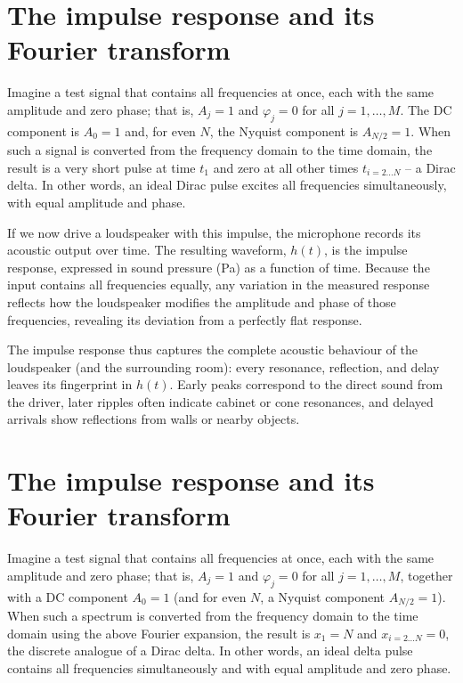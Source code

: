 \documentclass[12pt,a4paper]{article}
\providecommand{\seclabel}[1]{\label{sec:#1}}
\begin{document}
\section{The impulse response and its Fourier transform}\seclabel{impulse_response}
Imagine a test signal that contains all frequencies at once, each with the same amplitude and zero phase; that is, $A_j = 1$ and $\varphi_j = 0$ for all $j = 1, \ldots, M$. The DC component is $A_0 = 1$ and, for even $N$, the Nyquist component is $A_{N/2} = 1$. When such a signal is converted from the frequency domain to the time domain, the result is a very short pulse at time $t_1$ and zero at all other times $t_{i = 2\ldots N}$ -- a Dirac delta. In other words, an ideal Dirac pulse excites all frequencies simultaneously, with equal amplitude and phase.

If we now drive a loudspeaker with this impulse, the microphone records its acoustic output over time.  
The resulting waveform, $h(t)$, is the impulse response, expressed in sound pressure (Pa) as a function of time.  
Because the input contains all frequencies equally, any variation in the measured response reflects how the loudspeaker modifies the amplitude and phase of those frequencies, revealing its deviation from a perfectly flat response.

The impulse response thus captures the complete acoustic behaviour of the loudspeaker (and the surrounding room): every resonance, reflection, and delay leaves its fingerprint in $h(t)$.  
Early peaks correspond to the direct sound from the driver, later ripples often indicate cabinet or cone resonances, and delayed arrivals show reflections from walls or nearby objects.


\section{The impulse response and its Fourier transform}

Imagine a test signal that contains all frequencies at once, each with the same amplitude and zero phase; that is, $A_j = 1$ and $\varphi_j = 0$ for all $j = 1, \ldots, M$, together with a DC component $A_0 = 1$ (and for even $N$, a Nyquist component $A_{N/2} = 1$). When such a spectrum is converted from the frequency domain to the time domain using the above Fourier expansion, the result is $x_1 = N$ and $x_{i=2\ldots N} = 0$, the discrete analogue of a Dirac delta. In other words, an ideal delta pulse contains all frequencies simultaneously and with equal amplitude and zero phase.
\end{document}
